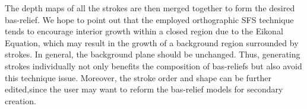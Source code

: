 \newline
The depth maps of all the strokes are then merged together to form the desired bas-relief. We hope to point out that the employed orthographic SFS technique tends to encourage interior growth within a closed region due to the Eikonal Equation, which may result in the growth of a background region surrounded by strokes. In general, the background plane should be unchanged. Thus, generating strokes individually not only benefits the composition of bas-reliefs but also avoid this technique issue.
Moreover, the stroke order and shape can be further edited,since the user may want to reform the bas-relief models for secondary creation.
\newpage 
